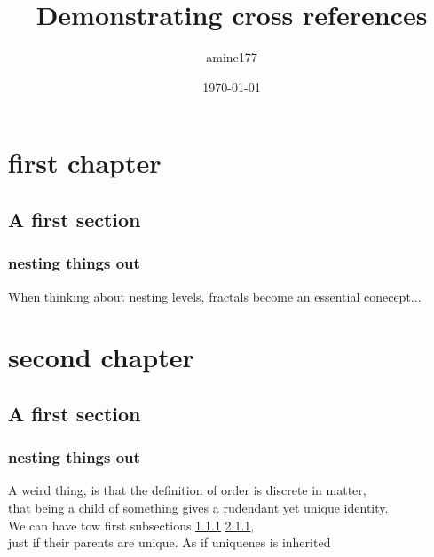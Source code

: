 \documentclass{report}
\begin{document}
\title{Demonstrating cross references}
\author{amine177}
\date{\today}
\maketitle
\tableofcontents
\chapter{first chapter}
\section{A first section}
\subsection{nesting things out}
\label{sec:ss1}
When thinking about nesting levels, fractals become an essential conecept...
\chapter{second chapter}
\section{A first section}
\subsection{nesting things out}
\label{sec:ss2}
A weird thing, is that the definition of order is discrete in matter, \\
that being a child of something gives a rudendant yet unique identity.\\
We can have tow first subsections \ref{sec:ss1} \ref{sec:ss2}, \\
just if their parents are unique. As if uniquenes is inherited
\end{document}
